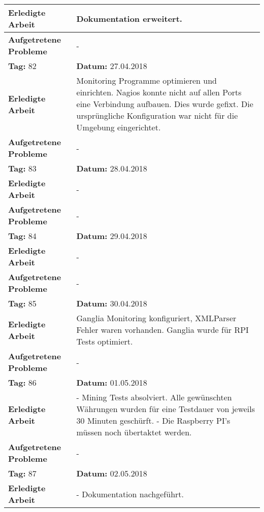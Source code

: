 \begin{longtable}{|p{5cm}|p{5cm}p{6cm}|}
\textbf{Erledigte Arbeit} & \multicolumn{2}{p{11cm}|}{Dokumentation erweitert.} \\ \hline
\textbf{Aufgetretene Probleme} & \multicolumn{2}{p{11cm}|}{-} \\ \hline
\rowcolor{heading}\textbf{Tag:} 82 & \textbf{Datum:} 27.04.2018 & \\ \hline
\textbf{Erledigte Arbeit} & \multicolumn{2}{p{11cm}|}{Monitoring Programme optimieren und einrichten. Nagios konnte nicht auf allen Ports eine Verbindung aufbauen. Dies wurde gefixt. Die ursprüngliche Konfiguration war nicht für die Umgebung eingerichtet.} \\ \hline
\textbf{Aufgetretene Probleme} & \multicolumn{2}{p{11cm}|}{-} \\ \hline
\rowcolor{heading}\textbf{Tag:} 83 & \textbf{Datum:} 28.04.2018 & \\ \hline
\textbf{Erledigte Arbeit} & \multicolumn{2}{p{11cm}|}{-} \\ \hline
\textbf{Aufgetretene Probleme} & \multicolumn{2}{p{11cm}|}{-} \\ \hline
\rowcolor{heading}\textbf{Tag:} 84 & \textbf{Datum:} 29.04.2018 & \\ \hline
\textbf{Erledigte Arbeit} & \multicolumn{2}{p{11cm}|}{-} \\ \hline
\textbf{Aufgetretene Probleme} & \multicolumn{2}{p{11cm}|}{-} \\ \hline
\rowcolor{heading}\textbf{Tag:} 85 & \textbf{Datum:} 30.04.2018 & \\ \hline
\textbf{Erledigte Arbeit} & \multicolumn{2}{p{11cm}|}{Ganglia Monitoring konfiguriert, XMLParser Fehler waren vorhanden. Ganglia wurde für RPI Tests optimiert.} \\ \hline
\textbf{Aufgetretene Probleme} & \multicolumn{2}{p{11cm}|}{-} \\ \hline
\rowcolor{heading}\textbf{Tag:} 86 & \textbf{Datum:} 01.05.2018 & \\ \hline
\textbf{Erledigte Arbeit} & \multicolumn{2}{p{11cm}|}{- Mining Tests absolviert. Alle gewünschten Währungen wurden für eine Testdauer von jeweils 30 Minuten geschürft. \newline
- Die Raspberry PI's müssen noch übertaktet werden.} \\ \hline
\textbf{Aufgetretene Probleme} & \multicolumn{2}{p{11cm}|}{-} \\ \hline
\rowcolor{heading}\textbf{Tag:} 87 & \textbf{Datum:} 02.05.2018 & \\ \hline
\textbf{Erledigte Arbeit} & \multicolumn{2}{p{11cm}|}{- Dokumentation nachgeführt. \newline
}
\end{longtable}

